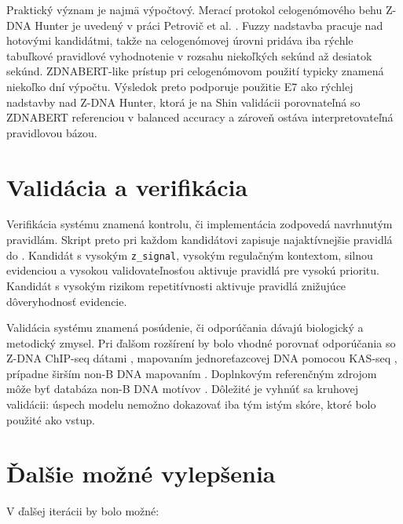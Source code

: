 \documentclass[12pt,a4paper]{article}
\begin{document}
Praktický význam je najmä výpočtový. Merací protokol celogenómového behu Z-DNA Hunter je uvedený v práci Petrovič et al. \citep{petrovic2025}. Fuzzy nadstavba pracuje nad hotovými kandidátmi, takže na celogenómovej úrovni pridáva iba rýchle tabuľkové pravidlové vyhodnotenie v rozsahu niekoľkých sekúnd až desiatok sekúnd. ZDNABERT-like prístup pri celogenómovom použití typicky znamená niekoľko dní výpočtu. Výsledok preto podporuje použitie E7 ako rýchlej nadstavby nad Z-DNA Hunter, ktorá je na Shin validácii porovnateľná so ZDNABERT referenciou v balanced accuracy a zároveň ostáva interpretovateľná pravidlovou bázou.

\section{Validácia a verifikácia}

Verifikácia systému znamená kontrolu, či implementácia zodpovedá navrhnutým pravidlám. Skript preto pri každom kandidátovi zapisuje najaktívnejšie pravidlá do . Kandidát s vysokým \texttt{z\_signal}, vysokým regulačným kontextom, silnou evidenciou a vysokou validovateľnosťou aktivuje pravidlá pre vysokú prioritu. Kandidát s vysokým rizikom repetitívnosti aktivuje pravidlá znižujúce dôveryhodnosť evidencie.

Validácia systému znamená posúdenie, či odporúčania dávajú biologický a metodický zmysel. Pri ďalšom rozšírení by bolo vhodné porovnať odporúčania so Z-DNA ChIP-seq dátami \citep{shin2016}, mapovaním jednoreťazcovej DNA pomocou KAS-seq \citep{wu2020}, prípadne širším non-B DNA mapovaním \citep{kouzine2017}. Doplnkovým referenčným zdrojom môže byť databáza non-B DNA motívov \citep{cer2013}. Dôležité je vyhnúť sa kruhovej validácii: úspech modelu nemožno dokazovať iba tým istým skóre, ktoré bolo použité ako vstup.

\section{Ďalšie možné vylepšenia}

V ďalšej iterácii by bolo možné:
\end{document}
